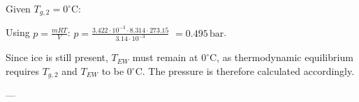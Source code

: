 Given \( T_{g,2} = 0^\circ \text{C} \):  

Using \( p = \frac{mRT}{V} \):  
\( p = \frac{3.422 \cdot 10^{-3} \cdot 8.314 \cdot 273.15}{3.14 \cdot 10^{-3}} \)  
\( = 0.495 \, \text{bar} \).  

Since ice is still present, \( T_{EW} \) must remain at \( 0^\circ \text{C} \), as thermodynamic equilibrium requires \( T_{g,2} \) and \( T_{EW} \) to be \( 0^\circ \text{C} \). The pressure is therefore calculated accordingly.  

---